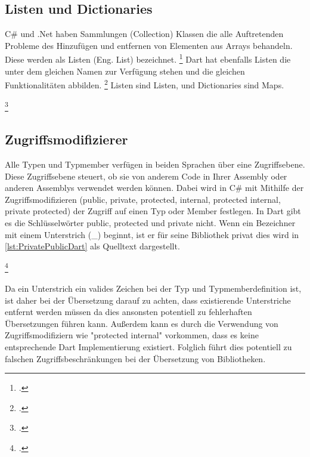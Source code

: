 \subsection{Listen und Dictionaries}
C\# und .Net haben Sammlungen (Collection) Klassen die alle Auftretenden Probleme des Hinzufügen und entfernen von Elementen aus Arrays behandeln.  Diese werden als Listen (Eng. List) bezeichnet. \footcite[Vgl.][S. 413]{Stellman2021} Dart hat ebenfalls Listen die unter dem gleichen Namen zur Verfügung stehen und die gleichen Funktionalitäten abbilden. \footcite[Vgl.][S. 12f ]{Meiller2020}
Listen sind Listen, und Dictionaries sind Maps.


\begin{minipage}{\linewidth}

\end{minipage}
\footcitetext[In Anlehnung an ][Abgerufen am \today]{Pedley2019}



\subsection{Zugriffsmodifizierer}

Alle Typen und Typmember verfügen in beiden Sprachen über eine Zugriffsebene.  Diese Zugriffsebene steuert, ob sie von anderem Code in Ihrer Assembly oder anderen Assemblys verwendet werden können.  Dabei wird in C\# mit Mithilfe der Zugriffsmodifizieren (public,  private,  protected,  internal,  protected internal,  private protected) der Zugriff auf einen Typ oder Member festlegen.  In Dart gibt es die Schlüsselwörter public,  protected und private nicht. Wenn ein Bezeichner mit einem Unterstrich (\_) beginnt, ist er für seine Bibliothek privat dies wird in \ref{lst:PrivatePublicDart} als Quelltext dargestellt. 

\begin{minipage}{\linewidth}

\end{minipage}
\footcitetext[In Anlehnung an ][Abgerufen am \today]{Pedley2019}

Da ein Unterstrich ein valides Zeichen bei der Typ und Typmemberdefinition ist, ist daher bei der Übersetzung darauf zu achten,  dass existierende Unterstriche entfernt werden müssen da dies ansonsten potentiell zu fehlerhaften Übersetzungen führen kann.  Außerdem kann es durch die Verwendung von Zugriffsmodifiziern wie "protected internal" vorkommen, dass es keine entsprechende Dart Implementierung existiert.  Folglich führt dies potentiell zu falschen Zugriffsbeschränkungen bei der Übersetzung von Bibliotheken. 


